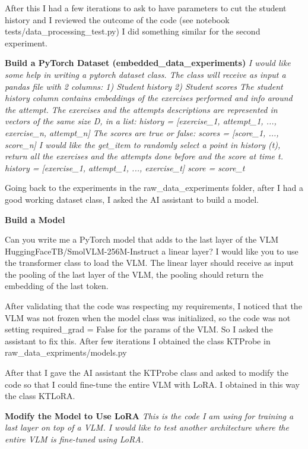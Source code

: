 \documentclass[10pt]{article}
\begin{document}
After this I had a few iterations to ask to have parameters to cut the student history and I reviewed the outcome of the code (see notebook tests/data\_processing\_test.py)
I did something similar for the second experiment.

\medskip\noindent\textbf{Build a PyTorch Dataset (embedded\_data\_experiments)}
\textit{I would like some help in writing a pytorch dataset class.
The class will receive as input a pandas file with 2 columns: 1) Student history 2) Student scores
The student history column contains embeddings of the exercises performed and info around the attempt. The exercises and the attempts descriptions are represented in vectors of the same size D, in a list: history  = [exercise\_1, attempt\_1, ..., exercise\_n, attempt\_n]
The scores are true or false: scores = [score\_1, ..., score\_n]
I would like the get\_item to randomly select a point in history (t), return all the exercises and the attempts done before and the score at time t.
history = [exercise\_1, attempt\_1, ..., exercise\_t] score = score\_t}

Going back to the experiments in the raw\_data\_experiments folder, after I had a good working dataset class, I asked the AI assistant to build a model.

\medskip\noindent\textbf{Build a Model}
\begin{itshape}Can you write me a PyTorch model that adds to the last layer of the VLM HuggingFaceTB/SmolVLM-256M-Instruct a linear layer?
I would like you to use the transformer class to load the VLM.
The linear layer should receive as input the pooling of the last layer of the VLM, the pooling should return the embedding of the last token.\end{itshape}

After validating that the code was respecting my requirements, I noticed that the VLM was not frozen when the model class was initialized,
so the code was not setting required\_grad = False for the params of the VLM. So I asked the assistant to fix this. After few iterations I obtained the class
KTProbe in raw\_data\_expriments/models.py

After that I gave the AI assistant the KTProbe class and asked to modify the code so that I could fine-tune the entire VLM with LoRA.
I obtained in this way the class KTLoRA.

\medskip\noindent\textbf{Modify the Model to Use LoRA}
\textit{This is the code I am using for training a last layer on top of a VLM.
I would like to test another architecture where the entire VLM is fine-tuned using LoRA.}
\end{document}
